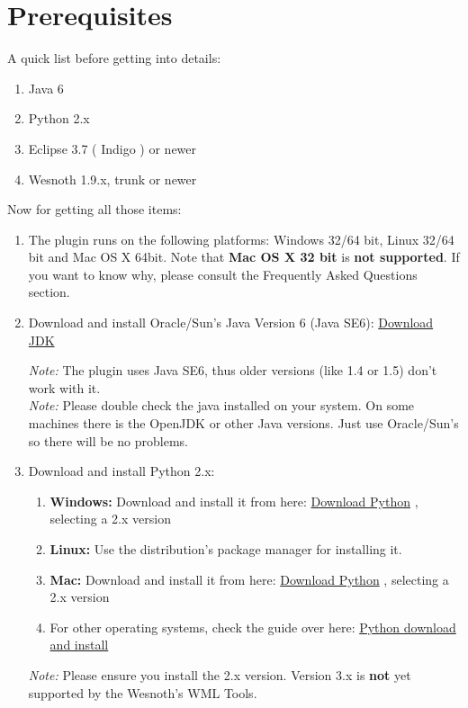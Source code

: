 \documentclass[10pt]{article}
\begin{document}
\section{Prerequisites}
A quick list before getting into details:
\begin{enumerate}
\item Java 6
\item Python 2.x
\item Eclipse 3.7 ( Indigo ) or newer
\item Wesnoth 1.9.x, trunk or newer
\end{enumerate}

Now for getting all those items:
\begin{enumerate}
\item The plugin runs on the following platforms: Windows 32/64 bit, Linux 32/64 bit and Mac OS X 64bit. Note that \textbf{Mac OS X 32 bit} is \textbf{not supported}. If you want to know why, please consult the Frequently Asked Questions section.
\item Download and install Oracle/Sun's Java Version 6 (Java SE6): \href{http://java.sun.com/javase/downloads/widget/jdk6.jsp}{Download JDK}

\textit{Note:} The plugin uses Java SE6, thus older versions (like 1.4 or 1.5) don't work with it.\\
\textit{Note:} Please double check the java installed on your system. On some machines there is the OpenJDK or other Java versions. Just use Oracle/Sun's so there will be no problems.

\item Download and install Python 2.x:
 \begin{enumerate}
   \item \textbf{Windows:} Download and install it from here: \href{http://python.org/download/}{Download Python} , selecting a 2.x version
   \item \textbf{Linux:} Use the distribution's package manager for installing it.
   \item \textbf{Mac:} Download and install it from here: \href{http://python.org/download/}{Download Python} , selecting a 2.x version
   \item For other operating systems, check the guide over here: \href{http://wiki.python.org/moin/BeginnersGuide/Download}{Python download and install}
  \end{enumerate}
 \textit{Note:} Please ensure you install the 2.x version. Version 3.x is \textbf{not} yet supported by the Wesnoth's WML Tools.


\end{enumerate}
\end{document}
